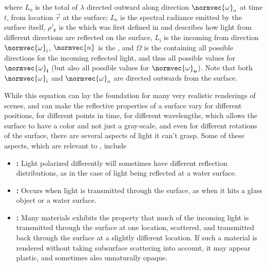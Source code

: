 {where $L_{\text{o}}$ is the total  of  $\lambda$ directed outward along direction $\normvec{\omega}_{\text{o}}$ at time $t$, from location $\vec{r}$ at the surface; $L_{\text{e}}$ is the spectral radiance emitted by the surface itself, $\rho'_{\textbf{r}}$ is the \BRDF which was first defined in \citep{temp} and describes how light from different directions are reflected on the surface, $L_{\text{i}}$ is the  incoming from direction $\normvec{\omega}_{\text{i}}$, $\normvec{n}$ is the , and $\Omega$ is the  containing all possible directions for the incoming reflected light, and thus all possible values for $\normvec{\omega}_{\textbf{i}}$ (but also all possible values for $\normvec{\omega}_{\textbf{o}}$). Note that both $\normvec{\omega}_{\text{i}}$ and $\normvec{\omega}_{\text{o}}$ are directed outwards from the surface.

While this equation can lay the foundation for many very realistic renderings of \threedimensional scenes, and can make the reflective properties of a surface vary for different positions, for different points in time, for different wavelengths, which allows the surface to have a color and not just a gray-scale, and even for different rotations of the surface, there are several aspects of light it can't grasp. Some of these aspects, which are relevant to \surfacewaterrendering, include

\begin{itemize}
\item \textbf{:} Light polarized differently will sometimes have different reflection distributions, as in the case of light being reflected at a water surface.

\item \textbf{:} Occurs when light is transmitted through the surface, as when it hits a glass object or a water surface.

\item \textbf{:} Many materials exhibits the property that much of the incoming light is transmitted through the surface at one location, scattered, and transmitted back through the surface at a slightly different location. If such a material is rendered without taking subsurface scattering into account, it may appear plastic, and sometimes also unnaturally opaque.


\end{itemize}}
